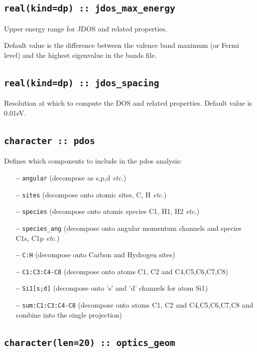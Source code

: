\documentclass[a4paper,11pt,twoside]{book}
\begin{document}
{\subsection[jdos\_max\_energy]{\tt real(kind=dp) :: jdos\_max\_energy}
Upper energy range for JDOS and related properties.

Default value is the difference between the valence band maximum (or
Fermi level) and the highest eigenvalue in the bands file.

\subsection[jdos\_spacing]{\tt real(kind=dp) :: jdos\_spacing} 
Resolution at which to compute the DOS and related properties.
Default value is 0.01eV. 

\subsection[pdos]{\tt character :: pdos}
Defines which components to include in the pdos analysis:

\begin{itemize}
\item[{\bf --}]  \verb#angular# (decompose as s,p,d \emph{etc.})
\item[{\bf --}]  \verb#sites#    (decompose onto atomic sites, C, H \emph{etc.})
\item[{\bf --}]  \verb#species#    (decompose onto atomic species C1, H1, H2 \emph{etc.})
\item[{\bf --}]  \verb#species_ang#    (decompose onto angular momentum channels and species C1s, C1p \emph{etc.})
\item[{\bf --}]  \verb#C:H#     (decompose onto Carbon and Hydrogen sites)
\item[{\bf --}]  \verb#C1:C3:C4-C8#  (decompose onto atoms C1, C2 and C4,C5,C6,C7,C8)
\item[{\bf --}]  \verb#Si1[s;d]#     (decompose onto 's' and 'd' channels for
  atom Si1)
\item[{\bf --}]  \verb#sum:C1:C3:C4-C8#  (decompose onto atoms C1, C2 and C4,C5,C6,C7,C8 and combine into the single projection)

\end{itemize}


\subsection[optics\_geom]{\tt character(len=20) :: optics\_geom}

}
\end{document}
